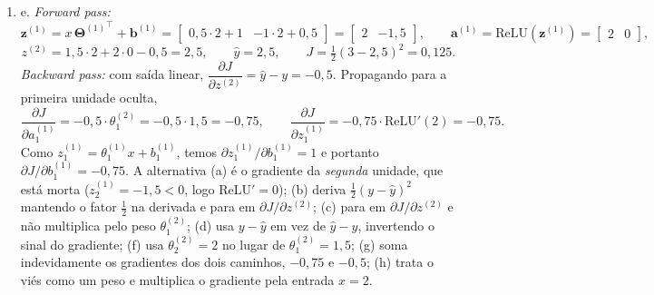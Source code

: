 \documentclass{dlproblemset}
\begin{document}
\begin{enumerate}[1)]
    \item e. \textit{Forward pass:}
    \[
    \mathbf{z}^{(1)} = x\,{\mathbf{\Theta}^{(1)}}^{\top} + \mathbf{b}^{(1)}
    = \begin{bmatrix} 0{,}5 \cdot 2 + 1 & -1 \cdot 2 + 0{,}5 \end{bmatrix} = \begin{bmatrix} 2 & -1{,}5 \end{bmatrix},
    \qquad
    \mathbf{a}^{(1)} = \mathrm{ReLU}(\mathbf{z}^{(1)}) = \begin{bmatrix} 2 & 0 \end{bmatrix},
    \]
    \[
    z^{(2)} = 1{,}5 \cdot 2 + 2 \cdot 0 - 0{,}5 = 2{,}5, \qquad \hat{y} = 2{,}5, \qquad J = \tfrac{1}{2}(3 - 2{,}5)^2 = 0{,}125 .
    \]
    \textit{Backward pass:} com saída linear, $\dfrac{\partial J}{\partial z^{(2)}} = \hat{y} - y = -0{,}5$. Propagando para a primeira unidade oculta,
    \[
    \frac{\partial J}{\partial a^{(1)}_1} = -0{,}5 \cdot \theta^{(2)}_1 = -0{,}5 \cdot 1{,}5 = -0{,}75,
    \qquad
    \frac{\partial J}{\partial z^{(1)}_1} = -0{,}75 \cdot \mathrm{ReLU}'(2) = -0{,}75 .
    \]
    Como $z^{(1)}_1 = \theta^{(1)}_1 x + b^{(1)}_1$, temos $\partial z^{(1)}_1 / \partial b^{(1)}_1 = 1$ e portanto $\partial J / \partial b^{(1)}_1 = -0{,}75$. A alternativa (a) é o gradiente da \emph{segunda} unidade, que está morta ($z^{(1)}_2 = -1{,}5 < 0$, logo $\mathrm{ReLU}' = 0$); (b) deriva $\tfrac{1}{2}(y - \hat{y})^2$ mantendo o fator $\tfrac{1}{2}$ na derivada e para em $\partial J / \partial z^{(2)}$; (c) para em $\partial J / \partial z^{(2)}$ e não multiplica pelo peso $\theta^{(2)}_1$; (d) usa $y - \hat{y}$ em vez de $\hat{y} - y$, invertendo o sinal do gradiente; (f) usa $\theta^{(2)}_2 = 2$ no lugar de $\theta^{(2)}_1 = 1{,}5$; (g) soma indevidamente os gradientes dos dois caminhos, $-0{,}75$ e $-0{,}5$; (h) trata o viés como um peso e multiplica o gradiente pela entrada $x = 2$.


\end{enumerate}
\end{document}
